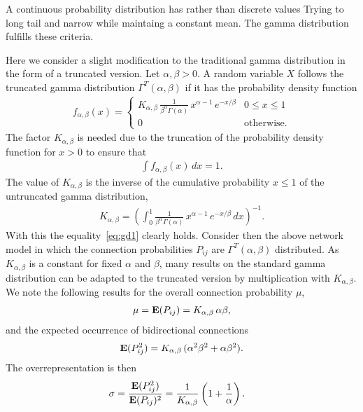 
A continuous probability distribution has rather than discrete values   Trying to long tail and narrow while maintaing a constant mean. The gamma distribution fulfills these criteria.

Here we consider a slight modification to the traditional gamma distribution in the form of a truncated version. Let $\alpha, \beta > 0$. A random variable $X$ follows the truncated gamma distribution $\Gamma^T(\alpha, \beta)$ if it has the probability density function 
%
\begin{align}
  f_{\alpha,\beta}(x) = \begin{cases} K_{\alpha, \beta}\,
\frac{1}{\beta^{\alpha}\Gamma(\alpha)}\, x^{\alpha-1}\,e^{-x/\beta} & 0 \leq x \leq 1 \\
0 & \text{otherwise}.
\end{cases}
\end{align}
%
The factor $K_{\alpha,\beta}$ is needed due to the truncation of the probability density function for $x>0$ to ensure that
\begin{align}
  \int f_{\alpha,\beta}(x) \,dx = 1. \label{eq:gd1}
\end{align}
The value of $K_{\alpha,\beta}$ is the inverse of the cumulative probability $x \leq 1$ of the untruncated gamma distribution,
\begin{align}
  K_{\alpha,\beta} = \left(\int_0^{1} \frac{1}{\beta^{\alpha}\Gamma(\alpha)}\, x^{\alpha-1}\,e^{-x/\beta} \, dx \right)^{-1}.
\end{align}
With this the equality~\eqref{eq:gd1} clearly holds. Consider then the above network model in which the connection probabilities $P_{ij}$ are $\Gamma^T(\alpha, \beta)$ distributed. As $K_{\alpha,\beta}$ is a constant for fixed $\alpha$ and $\beta$, many results on the standard gamma distribution can be adapted to the truncated version by multiplication with $K_{\alpha,\beta}$. We note the following results for the overall connection probability $\mu$,
%
\begin{align}
 \mu = \operatorname{\mathbf{E}}(P_{ij}) = K_{\alpha,\beta} \, \alpha \beta, \label{eq:gd1}
\end{align}
and the expected occurrence of bidirectional connections
\begin{align}
  \operatorname{\mathbf{E}}(P_{ij}^2) = K_{\alpha,\beta} \, (\alpha^2 \beta^2 + \alpha \beta^2).
\end{align}
%
The overrepresentation is then
\begin{align}
  \sigma & = \frac{\E(P_{ij}^2)}{\E(P_{ij})^2} =%
 \frac{1}{K_{\alpha,\beta}} \left(1 + \frac{1}{\alpha}\right).
\end{align}

